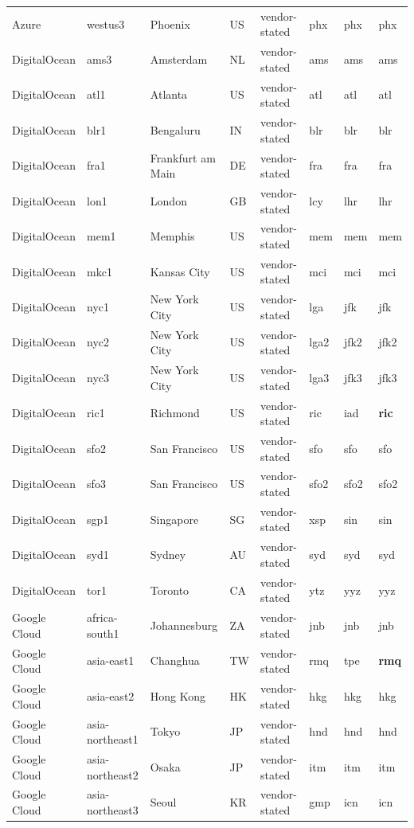 \begin{longtable}{llllllll}
Azure & westus3 & Phoenix & US & vendor-stated & phx & phx & phx \\
DigitalOcean & ams3 & Amsterdam & NL & vendor-stated & ams & ams & ams \\
DigitalOcean & atl1 & Atlanta & US & vendor-stated & atl & atl & atl \\
DigitalOcean & blr1 & Bengaluru & IN & vendor-stated & blr & blr & blr \\
DigitalOcean & fra1 & Frankfurt am Main & DE & vendor-stated & fra & fra & fra \\
DigitalOcean & lon1 & London & GB & vendor-stated & lcy & lhr & lhr \\
DigitalOcean & mem1 & Memphis & US & vendor-stated & mem & mem & mem \\
DigitalOcean & mkc1 & Kansas City & US & vendor-stated & mci & mci & mci \\
DigitalOcean & nyc1 & New York City & US & vendor-stated & lga & jfk & jfk \\
DigitalOcean & nyc2 & New York City & US & vendor-stated & lga2 & jfk2 & jfk2 \\
DigitalOcean & nyc3 & New York City & US & vendor-stated & lga3 & jfk3 & jfk3 \\
DigitalOcean & ric1 & Richmond & US & vendor-stated & ric & iad & \textbf{ric} \\
DigitalOcean & sfo2 & San Francisco & US & vendor-stated & sfo & sfo & sfo \\
DigitalOcean & sfo3 & San Francisco & US & vendor-stated & sfo2 & sfo2 & sfo2 \\
DigitalOcean & sgp1 & Singapore & SG & vendor-stated & xsp & sin & sin \\
DigitalOcean & syd1 & Sydney & AU & vendor-stated & syd & syd & syd \\
DigitalOcean & tor1 & Toronto & CA & vendor-stated & ytz & yyz & yyz \\
Google Cloud & africa-south1 & Johannesburg & ZA & vendor-stated & jnb & jnb & jnb \\
Google Cloud & asia-east1 & Changhua & TW & vendor-stated & rmq & tpe & \textbf{rmq} \\
Google Cloud & asia-east2 & Hong Kong & HK & vendor-stated & hkg & hkg & hkg \\
Google Cloud & asia-northeast1 & Tokyo & JP & vendor-stated & hnd & hnd & hnd \\
Google Cloud & asia-northeast2 & Osaka & JP & vendor-stated & itm & itm & itm \\
Google Cloud & asia-northeast3 & Seoul & KR & vendor-stated & gmp & icn & icn \\

\end{longtable}
